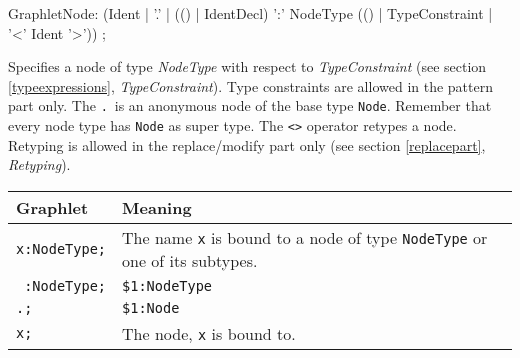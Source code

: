 \begin{rail}
GraphletNode: (Ident | 
    '.' |
    (() | IdentDecl) ':' NodeType (() | TypeConstraint | '<' Ident '>')) ;   
\end{rail}
Specifies a node of type \emph{NodeType} with respect to \emph{TypeConstraint} (see section \ref{typeexpressions}, \emph{TypeConstraint}). 
Type constraints are allowed in the pattern part only. 
The \texttt{.}\ is an anonymous node of the base type \texttt{Node}. 
Remember that every node type has \texttt{Node} as super type. The \texttt{<>} operator retypes a node. Retyping is allowed in the replace/modify part only (see section \ref{replacepart}, \emph{Retyping}).
\begin{center}
  \begin{tabularx}{\linewidth}{lX}
    \textbf{Graphlet} & \textbf{Meaning}\\ \hline
    \texttt{x:NodeType;} & The name \texttt{x} is bound to a node of type \texttt{NodeType} or one of its subtypes. \\
    \texttt{ :NodeType;} & \texttt{\$1:NodeType} \\
    \texttt{.;} & \texttt{\$1:Node} \\
    \texttt{x;} & The node, \texttt{x} is bound to.
  \end{tabularx}
\end{center} 

